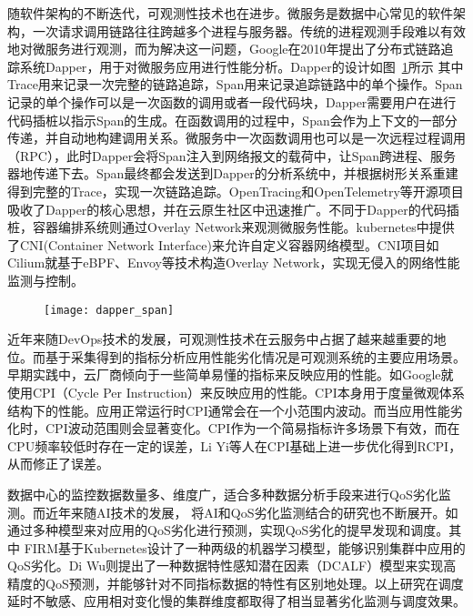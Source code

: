 随软件架构的不断迭代，可观测性技术也在进步。微服务是数据中心常见的软件架构，一次请求调用链路往往跨越多个进程与服务器。传统的进程观测手段难以有效地对微服务进行观测，而为解决这一问题，Google在2010年提出了分布式链路追踪系统Dapper\citep{sigelman2010dapper}，用于对微服务应用进行性能分析。Dapper的设计如图~\ref{fig:dapper_trace}所示 其中Trace用来记录一次完整的链路追踪，Span用来记录追踪链路中的单个操作。Span记录的单个操作可以是一次函数的调用或者一段代码块，Dapper需要用户在进行代码插桩以指示Span的生成。在函数调用的过程中，Span会作为上下文的一部分传递，并自动地构建调用关系。微服务中一次函数调用也可以是一次远程过程调用（RPC），此时Dapper会将Span注入到网络报文的载荷中，让Span跨进程、服务器地传递下去。Span最终都会发送到Dapper的分析系统中，并根据树形关系重建得到完整的Trace，实现一次链路追踪。OpenTracing和OpenTelemetry等开源项目吸收了Dapper的核心思想，并在云原生社区中迅速推广。不同于Dapper的代码插桩，容器编排系统则通过Overlay Network来观测微服务性能。kubernetes中提供了CNI(Container Network Interface)\citep{k8s-network-plugins}来允许自定义容器网络模型。CNI项目如Cilium\citep{cilium}就基于eBPF、Envoy等技术\citep{ebpf,envoyproxy}构造Overlay Network，实现无侵入的网络性能监测与控制。

\begin{figure}[H]
    \centering
    \texttt{[image: dapper\_span]}
    \label{fig:dapper_trace}
\end{figure}

近年来随DevOps技术的发展，可观测性技术在云服务中占据了越来越重要的地位。而基于采集得到的指标分析应用性能劣化情况是可观测系统的主要应用场景。早期实践中，云厂商倾向于一些简单易懂的指标来反映应用的性能。如Google就使用CPI（Cycle Per Instruction）\citep{zhang2013cpi2}来反映应用的性能。CPI本身用于度量微观体系结构下的性能。应用正常运行时CPI通常会在一个小范围内波动。而当应用性能劣化时，CPI波动范围则会显著变化。CPI作为一个简易指标许多场景下有效，而在CPU频率较低时存在一定的误差，Li Yi等人\citep{yi2020cpi}在CPI基础上进一步优化得到RCPI，从而修正了误差。

数据中心的监控数据数量多、维度广，适合多种数据分析手段来进行QoS劣化监测。而近年来随AI技术的发展， 将AI和QoS劣化监测结合的研究也不断展开。如通过多种模型\citep{qiu2020firm, zhou2022aquatope, wang2022deepscaling, gan2021sage, ghafouri2020survey,zheng2020web,wu2019posterior}来对应用的QoS劣化进行预测，实现QoS劣化的提早发现和调度。其中
FIRM\citep{qiu2020firm}基于Kubernetes设计了一种两级的机器学习模型，能够识别集群中应用的QoS劣化。Di Wu\citep{wu2020data}则提出了一种数据特性感知潜在因素（DCALF）模型来实现高精度的QoS预测，并能够针对不同指标数据的特性有区别地处理。以上研究在调度延时不敏感、应用相对变化慢的集群维度都取得了相当显著劣化监测与调度效果。

